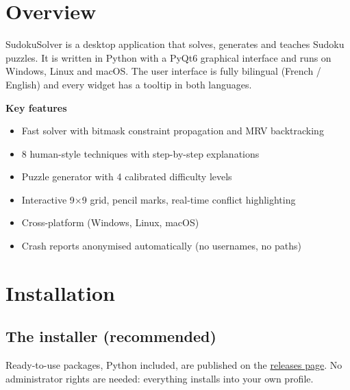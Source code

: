 
\usepackage[english]{babel}
\newcommand{\MANUELTITRE}{User manual}

\tableofcontents
\newpage
\section{Overview}

SudokuSolver is a desktop application that solves, generates and teaches
Sudoku puzzles. It is written in Python with a PyQt6 graphical interface and
runs on Windows, Linux and macOS. The user interface is fully bilingual
(French / English) and every widget has a tooltip in both languages.

\begin{infobox}
\textbf{Key features}
\begin{itemize}
  \item Fast solver with bitmask constraint propagation and MRV backtracking
  \item 8 human-style techniques with step-by-step explanations
  \item Puzzle generator with 4 calibrated difficulty levels
  \item Interactive 9$\times$9 grid, pencil marks, real-time conflict highlighting
  \item Cross-platform (Windows, Linux, macOS)
  \item Crash reports anonymised automatically (no usernames, no paths)
\end{itemize}
\end{infobox}

\section{Installation}\label{sec:en-install}

\subsection{The installer (recommended)}

Ready-to-use packages, Python included, are published on the
\href{https://github.com/ARP273-ROSE/SudokuSolver/releases/latest}{releases page}.
No administrator rights are needed: everything installs into your own profile.

